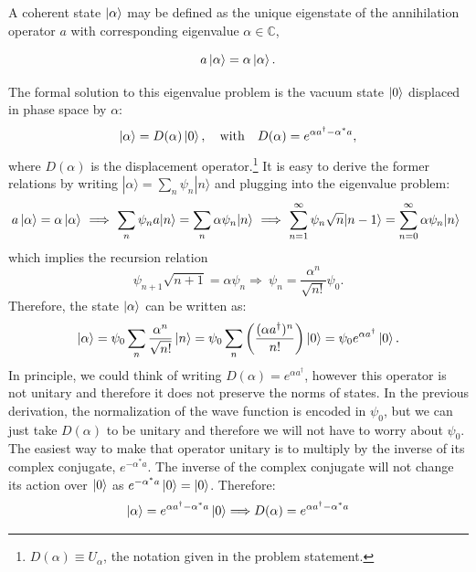 \documentclass[12pt]{article}
\begin{document}
\begin{appendices}
A coherent state $\ket{\alpha}$ may be defined as the unique eigenstate of the annihilation operator $a$ with corresponding eigenvalue $\alpha \in \mathbb{C}$,

\begin{equation}
    a\ket{\alpha} = \alpha\ket{\alpha}.
    \label{eq:eigenvalue-problem}
\end{equation}

The formal solution to this eigenvalue problem is the vacuum state $\ket{0}$ displaced in phase space by $\alpha$:
\begin{equation}
    \ket{\alpha} = D(\alpha)\ket{0},
    \qq{with} D(\alpha) = e^{\alpha a^\dag - \alpha^* a},
    \label{eq:displacement-operator}
\end{equation}
where $D(\alpha)$ is the displacement operator.\footnote{$D(\alpha) \equiv U_\alpha$, the notation given in the problem statement.} It is easy to derive the former relations by writing $|\alpha\rangle = \sum_n \psi_n |n\rangle$ and plugging into the eigenvalue problem:
\begin{equation}
    a\ket{\alpha} = \alpha\ket{\alpha}\ \Longrightarrow\ \sum_n \psi_n a |n\rangle = \sum_n \alpha \psi_n |n\rangle\ \Longrightarrow\  \sum_{n=1}^\infty \psi_n  \sqrt{n} |n-1\rangle = \sum_{n=0}^\infty \alpha \psi_n |n\rangle\
    \label{eq:eigenvalue-problem-derivation}
\end{equation}
which implies the recursion relation
\begin{equation}
    \psi_{n+1}\sqrt{n+1} = \alpha\psi_n \Longrightarrow\ \psi_n = \frac{\alpha^n}{\sqrt{n!}}\psi_0.
\end{equation}
Therefore, the state $\ket{\alpha}$ can be written as:
\begin{equation}
    \ket{\alpha} =\psi_0 \sum_n\frac{\alpha ^n}{\sqrt{n!}}\ket{n} = \psi_0 \sum_n \left( \frac{(\alpha a^{\dagger})^n}{n!} \right) \ket{0} = \psi_0 e^{\alpha a^{\dagger}} \ket{0}.
\end{equation}
In principle, we could think of writing $D(\alpha) = e^{\alpha a^{\dagger}}$, however this operator is not unitary and therefore it does not preserve the norms of states. In the previous derivation, the normalization of the wave function is encoded in $\psi_0$, but we can just take $D(\alpha)$ to be unitary and therefore we will not have to worry about $\psi_0$. The easiest way to make that operator unitary is to multiply by the inverse of its complex conjugate, $e^{-\alpha^*a}$. The inverse of the complex conjugate will not change its action over $\ket{0}$ as  $e^{-\alpha^*a}\ket{0} = \ket{0}$. Therefore:
\begin{equation}
    \ket{\alpha} =   e^{\alpha a^{\dagger}-\alpha^*a} \ket{0} \Longrightarrow D(\alpha) = e^{\alpha a^\dag - \alpha^* a}
\end{equation}


\end{appendices}
\end{document}
